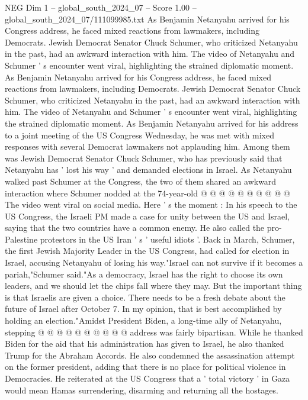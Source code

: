 \begin{textsample}{NEG Dim 1 – global\_south\_2024\_07 – Score 1.00 – global\_south\_2024\_07/111099985.txt}  \label{ex:f1_neg_276}
As Benjamin Netanyahu arrived for his Congress address, he faced mixed reactions from lawmakers, including Democrats.
Jewish Democrat Senator Chuck Schumer, who criticized Netanyahu in the past, had an awkward interaction with him.
The video of Netanyahu and Schumer ' s encounter went viral, highlighting the strained diplomatic moment.
As Benjamin Netanyahu arrived for his Congress address, he faced mixed reactions from lawmakers, including Democrats.
Jewish Democrat Senator Chuck Schumer, who criticized Netanyahu in the past, had an awkward interaction with him.
The video of Netanyahu and Schumer ' s encounter went viral, highlighting the strained diplomatic moment.
As Benjamin Netanyahu arrived for his address to a joint meeting of the US Congress Wednesday, he was met with mixed responses with several Democrat lawmakers not applauding him.
Among them was Jewish Democrat Senator Chuck Schumer, who has previously said that Netanyahu has ' lost his way ' and demanded elections in Israel.
As Netanyahu walked past Schumer at the Congress, the two of them shared an awkward interaction where Schumer nodded at the 74-year-old @ @ @ @ @ @ @ @ @ @ The video went viral on social media.
Here ' s the moment : In his speech to the US Congress, the Israeli PM made a case for unity between the US and Israel, saying that the two countries have a common enemy.
He also called the pro-Palestine protestors in the US Iran ' s ' useful idiots '.
Back in March, Schumer, the first Jewish Majority Leader in the US Congress, had called for election in Israel, accusing Netanyahu of losing his way."Israel can not survive if it becomes a pariah,"Schumer said."As a democracy, Israel has the right to choose its own leaders, and we should let the chips fall where they may.
But the important thing is that Israelis are given a choice.
There needs to be a fresh debate about the future of Israel after October 7.
In my opinion, that is best accomplished by holding an election."Amidst President Biden, a long-time ally of Netanyahu, stepping @ @ @ @ @ @ @ @ @ @ address was fairly bipartisan.
While he thanked Biden for the aid that his administration has given to Israel, he also thanked Trump for the Abraham Accords.
He also condemned the assassination attempt on the former president, adding that there is no place for political violence in Democracies.
He reiterated at the US Congress that a ' total victory ' in Gaza would mean Hamas surrendering, disarming and returning all the hostages.

\end{textsample}
